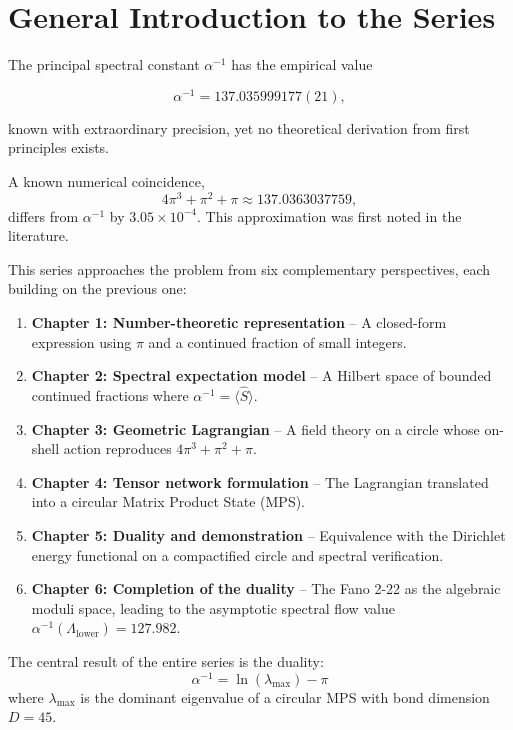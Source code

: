\documentclass[12pt]{article}
\numberwithin{equation}{section}
\begin{document}
\tableofcontents

\newpage

\section*{General Introduction to the Series}

The principal spectral constant \(\alpha^{-1}\) has the empirical value

\[
\alpha^{-1} = 137.035999177(21),
\]

known with extraordinary precision, yet no theoretical derivation from first principles exists.

A known numerical coincidence,
\[
4\pi^3 + \pi^2 + \pi \approx 137.0363037759,
\]
differs from \(\alpha^{-1}\) by \(3.05\times10^{-4}\). This approximation was first noted in the literature.

This series approaches the problem from six complementary perspectives, each building on the previous one:

\begin{enumerate}
    \item \textbf{Chapter 1: Number-theoretic representation} – A closed-form expression using \(\pi\) and a continued fraction of small integers.
    \item \textbf{Chapter 2: Spectral expectation model} – A Hilbert space of bounded continued fractions where \(\alpha^{-1} = \langle \hat S \rangle\).
    \item \textbf{Chapter 3: Geometric Lagrangian} – A field theory on a circle whose on-shell action reproduces \(4\pi^3 + \pi^2 + \pi\).
    \item \textbf{Chapter 4: Tensor network formulation} – The Lagrangian translated into a circular Matrix Product State (MPS).
    \item \textbf{Chapter 5: Duality and demonstration} – Equivalence with the Dirichlet energy functional on a compactified circle and spectral verification.
    \item \textbf{Chapter 6: Completion of the duality} – The Fano 2-22 as the algebraic moduli space, leading to the asymptotic spectral flow value \(\alpha^{-1}(\Lambda_{\text{lower}}) = 127.982\).
\end{enumerate}

The central result of the entire series is the duality:
\[
\boxed{\alpha^{-1} = \ln(\lambda_{\max}) - \pi}
\]
where \(\lambda_{\max}\) is the dominant eigenvalue of a circular MPS with bond dimension \(D = 45\).
\end{document}
